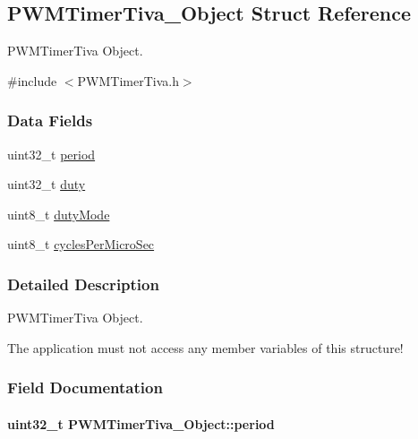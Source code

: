 \subsection{P\+W\+M\+Timer\+Tiva\+\_\+\+Object Struct Reference}
\label{struct_p_w_m_timer_tiva___object}


P\+W\+M\+Timer\+Tiva Object.  




{\ttfamily \#include $<$P\+W\+M\+Timer\+Tiva.\+h$>$}

\subsubsection*{Data Fields}
\begin{DoxyCompactItemize}
\item 
uint32\+\_\+t \hyperlink{struct_p_w_m_timer_tiva___object_a3dfed2664b77fac04d366b271a7e4f59}{period}
\item 
uint32\+\_\+t \hyperlink{struct_p_w_m_timer_tiva___object_a7718c73a04571c4825fffd34c1029170}{duty}
\item 
uint8\+\_\+t \hyperlink{struct_p_w_m_timer_tiva___object_a518e2c1814f2a05da976b4e9da22143b}{duty\+Mode}
\item 
uint8\+\_\+t \hyperlink{struct_p_w_m_timer_tiva___object_a91fd44574b6fdf1c845c61cf28569d9b}{cycles\+Per\+Micro\+Sec}
\end{DoxyCompactItemize}


\subsubsection{Detailed Description}
P\+W\+M\+Timer\+Tiva Object. 

The application must not access any member variables of this structure! 

\subsubsection{Field Documentation}
\paragraph[{period}]{\setlength{\rightskip}{0pt plus 5cm}uint32\+\_\+t P\+W\+M\+Timer\+Tiva\+\_\+\+Object\+::period}\label{struct_p_w_m_timer_tiva___object_a3dfed2664b77fac04d366b271a7e4f59}
